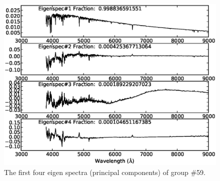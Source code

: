 \documentclass[manuscript]{aastex}
\begin{document}
\begin{figure}
   \centering
   \includegraphics[width=14cm, angle=0,clip]{f71.eps}
   \caption{The first four eigen spectra (principal components) of group \#59.
   }
   \label{Fig71}
\end{figure}
\end{document}
